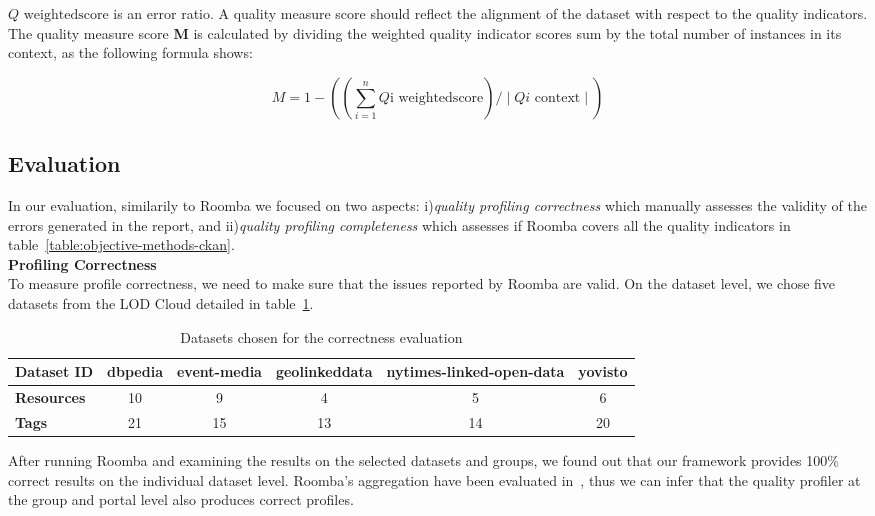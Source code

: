 $Q\textrm{ weightedscore}$ is an error ratio. A quality measure score should reflect the alignment of the dataset with respect to the quality indicators. The quality measure score \textbf{M} is calculated by dividing the weighted quality indicator scores sum by the total number of instances in its context, as the following formula shows:

\begin{equation}
M =  1 - ((\sum_{i=1}^{n} Q\textrm{i weightedscore}) / \mid Qi\textrm{ context} \mid )
\end{equation}

\subsection{Evaluation}

In our evaluation, similarily to Roomba we focused on two aspects: i)\textit{quality profiling correctness} which manually assesses the validity of the errors generated in the report, and ii)\textit{quality profiling completeness} which assesses if Roomba covers all the quality indicators in table~\ref{table:objective-methods-ckan}.\\

\textbf{Profiling Correctness}\\
To measure profile correctness, we need to make sure that the issues reported by Roomba are valid. On the dataset level, we chose five datasets from the LOD Cloud detailed in table~\ref{table:quality_dataset_experiment}.

\begin{table}[ht]
\centering
\begin{adjustwidth}{-.4in}{-.4in}
\begin{tabular}{|l|c|c|c|c|c|}
\hline
\textbf{Dataset ID} & dbpedia & event-media & geolinkeddata & nytimes-linked-open-data & yovisto \\ \hline
\textbf{Resources}  & 10      & 9           & 4             & 5                        & 6       \\ \hline
\textbf{Tags}       & 21      & 15          & 13            & 14                       & 20      \\ \hline
\end{tabular}
\end{adjustwidth}
\caption{Datasets chosen for the correctness evaluation}
\label{table:quality_dataset_experiment}
\end{table}

After running Roomba and examining the results on the selected datasets and groups, we found out that our framework provides 100\% correct results on the individual dataset level. Roomba's aggregation have been evaluated in~\cite{Assaf:ESWC:PROFILES:15}, thus we can infer that the quality profiler at the group and portal level also produces correct profiles.\\

